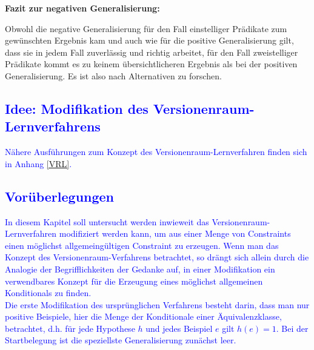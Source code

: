 \documentclass[a4paper, 11pt]{book}
\begin{document}
\textbf{{\large Fazit zur negativen Generalisierung:}} \label{Fazit neg Gen} 

\noindent
Obwohl die negative Generalisierung für den Fall einstelliger Prädikate zum gewünschten Ergebnis kam und auch wie für die positive Generalisierung gilt, dass sie in jedem Fall zuverlässig und richtig arbeitet, für den Fall zweistelliger Prädikate kommt es zu keinem übersichtlicheren Ergebnis als bei der positiven Generalisierung. Es ist also nach Alternativen zu forschen.

\textcolor{blue}{
	\section{Idee: Modifikation des Versionenraum-Lernverfahrens} \label{Verwendbar VRL} 
	Nähere Ausführungen zum Konzept des Versionenraum-Lernverfahren finden sich in Anhang \ref{VRL}.\\
	\subsection{Vorüberlegungen}
	In diesem Kapitel soll untersucht werden inwieweit das Versionenraum-Lernverfahren modifiziert werden kann, um aus einer Menge von Constraints einen möglichst allgemeingültigen Constraint zu erzeugen. Wenn man das Konzept des Versionenraum-Verfahrens betrachtet, so drängt sich allein durch die Analogie der Begrifflichkeiten der Gedanke auf, in einer Modifikation ein verwendbares Konzept für die Erzeugung eines möglichst allgemeinen Konditionals zu finden.
	\\
	Die erste Modifikation des ursprünglichen Verfahrens besteht darin, dass man nur positive Beispiele, hier die Menge der Konditionale einer Äquivalenzklasse, betrachtet, d.h. für jede Hypothese $ h $ und jedes Beispiel $ e $ gilt $ h(e) = 1 $.
	Bei der Startbelegung ist die speziellste Generalisierung zunächst leer. 
}
\end{document}
